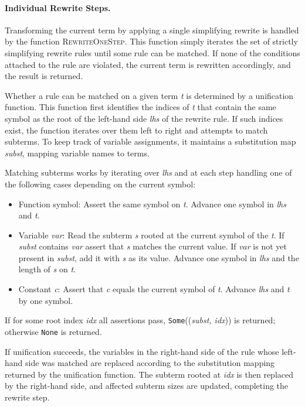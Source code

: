 \paragraph{Individual Rewrite Steps.} Transforming the current term by applying a single simplifying rewrite is handled by the function \textsc{RewriteOneStep}. This function simply iterates the set of strictly simplifying rewrite rules until some rule can be matched. If none of the conditions attached to the rule are violated, the current term is rewritten accordingly, and the result is returned.

Whether a rule can be matched on a given term \emph{t} is determined by a unification function. This function first identifies the indices of \emph{t} that contain the same symbol as the root of the left-hand side \emph{lhs} of the rewrite rule. If such indices exist, the function iterates over them left to right and attempts to match subterms. To keep track of variable assignments, it maintains a substitution map \emph{subst}, mapping variable names to terms.

Matching subterms works by iterating over \emph{lhs} and at each step handling one of the following cases depending on the current symbol:
\begin{itemize}
	\item Function symbol: Assert the same symbol on \emph{t}. Advance one symbol in \emph{lhs} and \emph{t}.
	\item Variable \emph{var}: Read the subterm \emph{s} rooted at the current symbol of the \emph{t}. If \emph{subst} contains \emph{var} assert that \emph{s} matches the current value. If \emph{var} is not yet present in \emph{subst}, add it with \emph{s} as its value. Advance one symbol in \emph{lhs} and the length of \emph{s} on \emph{t}.
	\item Constant \emph{c}: Assert that \emph{c} equals the current symbol of \emph{t}. Advance \emph{lhs} and \emph{t} by one symbol.
\end{itemize}

If for some root index \emph{idx} all assertions pass, \texttt{Some}((\emph{subst, idx})) is returned; otherwise \texttt{None} is returned.

If unification succeeds, the variables in the right-hand side of the rule whose left-hand side was matched are replaced according to the substitution mapping returned by the unification function. The subterm rooted at \emph{idx} is then replaced by the right-hand side, and affected subterm sizes are updated, completing the rewrite step.

